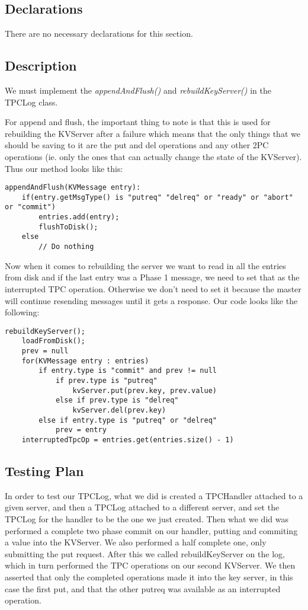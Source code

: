 \documentclass{article}
\begin{document}
\subsection*{Declarations}

There are no necessary declarations for this section.

\subsection*{Description}
We must implement the \textit{appendAndFlush()} and \textit{rebuildKeyServer()} in the TPCLog class.

For append and flush, the important thing to note is that this is used for rebuilding the KVServer after a failure which
means that the only things that we should be saving to it are the put and del operations and any other 2PC operations
(ie. only the ones that can actually change the state of the KVServer). Thus our method looks like this:
\begin{verbatim}
appendAndFlush(KVMessage entry):
    if(entry.getMsgType() is "putreq" "delreq" or "ready" or "abort" or "commit")
        entries.add(entry);
        flushToDisk();
    else 
        // Do nothing
\end{verbatim}

Now when it comes to rebuilding the server we want to read in all the entries from disk and if the last entry
was a Phase 1 message, we need to set that as the interrupted TPC operation. Otherwise we don't need to set it
because the master will continue resending messages until it gets a response.  Our code looks like the following:
\begin{verbatim}
rebuildKeyServer();
    loadFromDisk();
    prev = null
    for(KVMessage entry : entries)
        if entry.type is "commit" and prev != null
            if prev.type is "putreq"
                kvServer.put(prev.key, prev.value)
            else if prev.type is "delreq"
                kvServer.del(prev.key)
        else if entry.type is "putreq" or "delreq"
            prev = entry
    interruptedTpcOp = entries.get(entries.size() - 1)
\end{verbatim}

\subsection*{Testing Plan}

In order to test our TPCLog, what we did is created a TPCHandler attached to a given server, and then a TPCLog attached
to a different server, and set the TPCLog for the handler to be the one we just created. Then what we did was performed
a complete two phase commit on our handler, putting and commiting a value into the KVServer. We also performed a half
complete one, only submitting the put request. After this we called rebuildKeyServer on the log, which in turn performed
the TPC operations on our second KVServer. We then asserted that only the completed operations made it into the key
server, in this case the first put, and that the other putreq was available as an interrupted operation.
\end{document}
